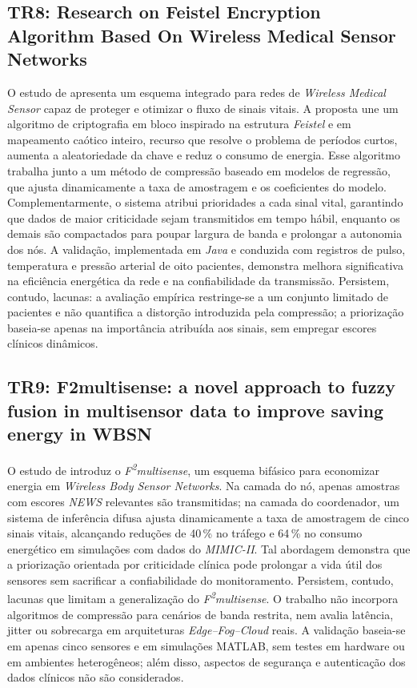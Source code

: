 \documentclass[twoside,english,brazilian]{UNISINOSmonografia}
\begin{document}
\subsection{TR8: Research on Feistel Encryption Algorithm Based On Wireless Medical Sensor Networks \cite{TAO2025}}
O estudo de \cite{TAO2025} apresenta um esquema integrado para redes de \textit{Wireless Medical Sensor} capaz de proteger e otimizar o fluxo de sinais vitais. A proposta une um algoritmo de criptografia em bloco inspirado na estrutura \textit{Feistel} e em mapeamento caótico inteiro, recurso que resolve o problema de períodos curtos, aumenta a aleatoriedade da chave e reduz o consumo de energia. Esse algoritmo trabalha junto a um método de compressão baseado em modelos de regressão, que ajusta dinamicamente a taxa de amostragem e os coeficientes do modelo. Complementarmente, o sistema atribui prioridades a cada sinal vital, garantindo que dados de maior criticidade sejam transmitidos em tempo hábil, enquanto os demais são compactados para poupar largura de banda e prolongar a autonomia dos nós. A validação, implementada em \textit{Java} e conduzida com registros de pulso, temperatura e pressão arterial de oito pacientes, demonstra melhora significativa na eficiência energética da rede e na confiabilidade da transmissão. Persistem, contudo, lacunas: a avaliação empírica restringe-se a um conjunto limitado de pacientes e não quantifica a distorção introduzida pela compressão; a priorização baseia-se apenas na importância atribuída aos sinais, sem empregar escores clínicos dinâmicos.

\subsection{TR9: F2multisense: a novel approach to fuzzy fusion in multisensor data to improve saving energy in WBSN \cite{Shankani2025}}
O estudo de \cite{Shankani2025} introduz o \textit{F\textsuperscript{2}multisense}, um esquema bifásico para economizar energia em \textit{Wireless Body Sensor Networks}. Na camada do nó, apenas amostras com escores \textit{NEWS} relevantes são transmitidas; na camada do coordenador, um sistema de inferência difusa ajusta dinamicamente a taxa de amostragem de cinco sinais vitais, alcançando reduções de 40\,\% no tráfego e 64\,\% no consumo energético em simulações com dados do \textit{MIMIC-II}. Tal abordagem demonstra que a priorização orientada por criticidade clínica pode prolongar a vida útil dos sensores sem sacrificar a confiabilidade do monitoramento. Persistem, contudo, lacunas que limitam a generalização do \textit{F\textsuperscript{2}multisense}. O trabalho não incorpora algoritmos de compressão para cenários de banda restrita, nem avalia latência, jitter ou sobrecarga em arquiteturas \textit{Edge–Fog–Cloud} reais. A validação baseia-se em apenas cinco sensores e em simulações MATLAB, sem testes em hardware ou em ambientes heterogêneos; além disso, aspectos de segurança e autenticação dos dados clínicos não são considerados.
\end{document}
